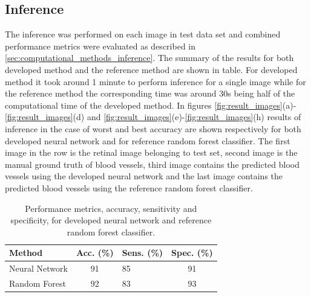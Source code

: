 \documentclass[aps,prb,10pt,twocolumn,groupedaddress]{revtex4-1}
\begin{document}
\subsection{Inference}
\label{sec:results_inference}
The inference was performed on each image in test data set and combined performance metrics were evaluated as described in \ref{sec:computational_methods_inference}. The summary of the results for both developed method and the reference method are shown in table. For developed method it took around 1 minute to perform inference for a single image while for the reference method the corresponding time was around 30s being half of the computational time of the developed method. In figures \ref{fig:result_images}(a)-\ref{fig:result_images}(d) and \ref{fig:result_images}(e)-\ref{fig:result_images}(h) results of inference in the case of worst and best accuracy are shown respectively for both developed neural network and for reference random forest classifier. The first image in the row is the retinal image belonging to test set, second image is the manual ground truth of blood vessels, third image contains the predicted blood vessels using the developed neural network and the last image contains the predicted blood vessels using the reference random forest classifier.
\begin{center}
	\begin{table}[h]
		\begin{tabular*}{0.45\textwidth}{lclc}
			Method & Acc. (\%) & Sens. (\%) & Spec. (\%)\\
			\hline
			Neural Network & 91 & 85 & 91\\
			Random Forest & 92 & 83 & 93\\
			\end{tabular*}
		\caption{Performance metrics, accuracy, sensitivity and specificity, for developed neural network and reference random forest classifier.}
		\label{tab:performance_metrics}
	\end{table}
\end{center}
\end{document}
